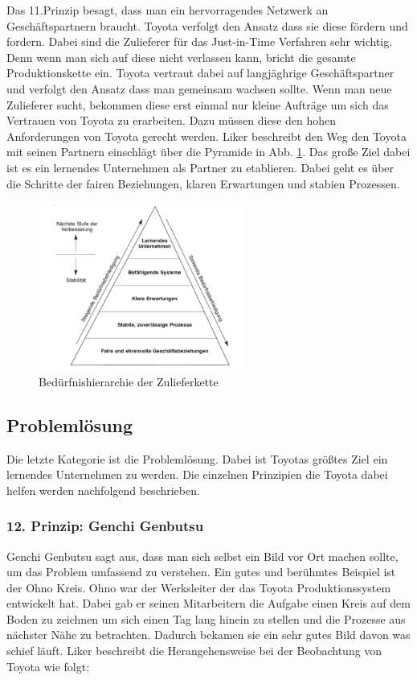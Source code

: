 \documentclass[a4paper,12pt]{scrartcl}
\begin{document}
Das 11.Prinzip besagt, dass man ein hervorragendes Netzwerk an Geschäftspartnern braucht. Toyota verfolgt den Ansatz dass sie diese fördern und fordern. Dabei sind die Zulieferer für das Just-in-Time Verfahren sehr wichtig. Denn wenn man sich auf diese nicht verlassen kann, bricht die gesamte Produktionskette ein. Toyota vertraut dabei auf langjäghrige Geschäftspartner und verfolgt den Ansatz dass man gemeinsam wachsen sollte. Wenn man neue Zulieferer sucht, bekommen diese erst einmal nur kleine Aufträge um sich das Vertrauen von Toyota zu erarbeiten. Dazu müssen diese den hohen Anforderungen von Toyota gerecht werden. Liker beschreibt den Weg den Toyota mit seinen Partnern einschlägt über die Pyramide in Abb. \ref{Netzwerk}. Das große Ziel dabei ist es ein lernendes Unternehmen als Partner zu etablieren. Dabei geht es über die Schritte der fairen Beziehungen, klaren Erwartungen und stabien Prozessen.

\begin{figure}[h] 
  \centering
     \includegraphics[width=0.6\textwidth]{Netzwerk.png}
  \caption{Bedürfnishierarchie der Zulieferkette}
  \label{Netzwerk}
\end{figure}


\subsection{Problemlösung}

Die letzte Kategorie ist die Problemlösung. Dabei ist Toyotas größtes Ziel ein lernendes Unternehmen zu werden. Die einzelnen Prinzipien die Toyota dabei helfen werden nachfolgend beschrieben.

\subsubsection{12. Prinzip: Genchi Genbutsu}

Genchi Genbutsu sagt aus, dass man sich selbst ein Bild vor Ort machen sollte, um das Problem umfassend zu verstehen. Ein gutes und berühmtes Beispiel ist der Ohno Kreis. Ohno war der Werksleiter der das Toyota Produktionssystem entwickelt hat. Dabei gab er seinen Mitarbeitern die Aufgabe einen Kreis auf dem Boden zu zeichnen um sich einen Tag lang hinein zu stellen und die Prozesse aus nächster Nähe zu betrachten. Dadurch bekamen sie ein sehr gutes Bild davon was schief läuft. Liker beschreibt die Herangehensweise bei der Beobachtung von Toyota wie folgt:
\end{document}
